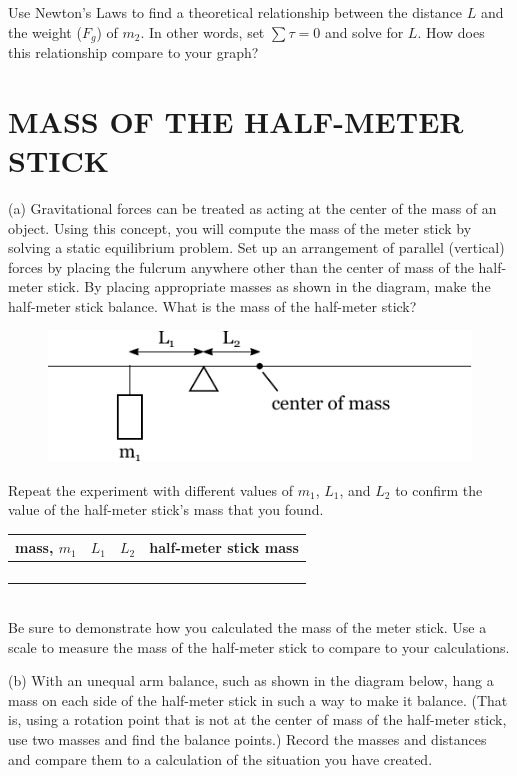 \documentclass[11pt,letterpaper]{article}
\begin{document}
Use Newton's Laws to find a theoretical relationship between the distance $L$ and the weight ($F_g$) of $m_2$. In other words, set $\sum\tau=0$ and solve for $L$. How does this relationship compare to your graph?


\section{MASS OF THE HALF-METER STICK}
(a) Gravitational forces can be treated as acting at the center of the mass of an object. Using this concept, you will compute the mass of the meter stick by solving a static equilibrium problem. Set up an arrangement of parallel (vertical) forces by placing the fulcrum anywhere other than the center of mass of the half-meter stick. By placing appropriate masses as shown in the diagram, make the half-meter stick balance.  What is the mass of the half-meter stick?

\begin{figure}[h]
\begin{center}
\includegraphics{./lab6_part2a.pdf}
\end{center}
\end{figure}

Repeat the experiment with different values of $m_1$, $L_1$, and $L_2$ to confirm the value of the half-meter stick's mass that you found.
 
\begin{tabularx}{\linewidth}{|Y|Y|Y|Y|}
\hline
mass, $m_1$ & $L_1$ & $L_2$ & half-meter stick mass \\
\hline &&&\\
\hline &&&\\
\hline &&&\\
\hline &&&\\
\hline
\end{tabularx}\\

Be sure to demonstrate how you calculated the mass of the meter stick. Use a scale to measure the mass of the half-meter stick to compare to your calculations.

\clearpage
(b) With an unequal arm balance, such as shown in the diagram below, hang
a mass on each side of the half-meter stick in such a way to make it
balance.  (That is, using a rotation point that is not at the center
of mass of the half-meter stick, use two masses and find the balance
points.)  Record the masses and distances and compare them to a
calculation of the situation you have created.
\end{document}
